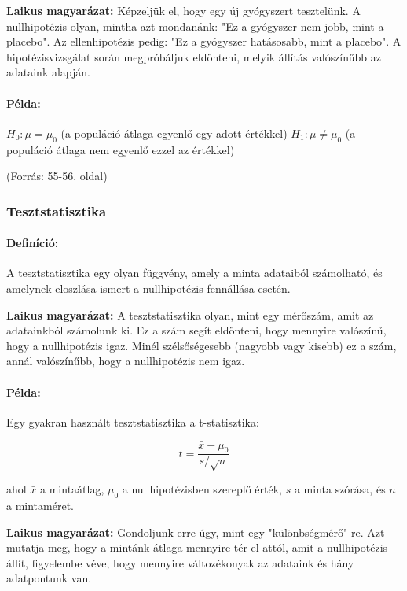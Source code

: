 \documentclass[a4paper,12pt]{article}
\begin{document}
    \textbf{Laikus magyarázat:}
    Képzeljük el, hogy egy új gyógyszert tesztelünk. A nullhipotézis olyan, mintha azt mondanánk: "Ez a gyógyszer nem jobb, mint a placebo". Az ellenhipotézis pedig: "Ez a gyógyszer hatásosabb, mint a placebo". A hipotézisvizsgálat során megpróbáljuk eldönteni, melyik állítás valószínűbb az adataink alapján.

    \paragraph{Példa:}
    $H_0: \mu = \mu_0$ (a populáció átlaga egyenlő egy adott értékkel)
    $H_1: \mu \neq \mu_0$ (a populáció átlaga nem egyenlő ezzel az értékkel)

    (Forrás: 55-56. oldal)

    \subsubsection{Tesztstatisztika}

    \paragraph{Definíció:}
    A tesztstatisztika egy olyan függvény, amely a minta adataiból számolható, és amelynek eloszlása ismert a nullhipotézis fennállása esetén.

    \textbf{Laikus magyarázat:}
    A tesztstatisztika olyan, mint egy mérőszám, amit az adatainkból számolunk ki. Ez a szám segít eldönteni, hogy mennyire valószínű, hogy a nullhipotézis igaz. Minél szélsőségesebb (nagyobb vagy kisebb) ez a szám, annál valószínűbb, hogy a nullhipotézis nem igaz.

    \paragraph{Példa:}
    Egy gyakran használt tesztstatisztika a t-statisztika:

    \[ t = \frac{\bar{x} - \mu_0}{s / \sqrt{n}} \]

    ahol $\bar{x}$ a mintaátlag, $\mu_0$ a nullhipotézisben szereplő érték, $s$ a minta szórása, és $n$ a mintaméret.

    \textbf{Laikus magyarázat:}
    Gondoljunk erre úgy, mint egy "különbségmérő"-re. Azt mutatja meg, hogy a mintánk átlaga mennyire tér el attól, amit a nullhipotézis állít, figyelembe véve, hogy mennyire változékonyak az adataink és hány adatpontunk van.
\end{document}
